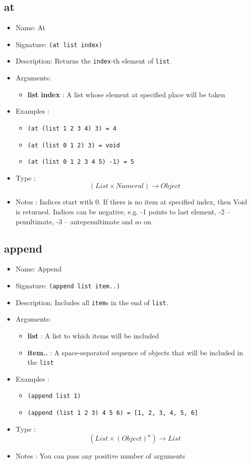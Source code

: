 \subsection{at}
\begin{itemize}
    \item Name: At
    \item Signature: \texttt{(at list index)}
    \item Description: Returns the \texttt{index}-th element of \texttt{list}.
    \item Arguments:
        \begin{itemize}
            \item \textbf{list index} : A list whose element at specified place will be taken
        \end{itemize}
    \item Examples :
        \begin{itemize}
            \item \texttt{(at (list 1 2 3 4) 3) = 4}
            \item \texttt{(at (list 0 1 2) 3) = void}
            \item \texttt{(at (list 0 1 2 3 4 5) -1) = 5}
        \end{itemize}
    \item Type : \[(List \times Numeral) \to Object\]
    \item Notes : Indices start with 0. If there is no item at specified index, then Void is returned. Indices can be negative, e.g. -1 points to last element, -2 -- penultimate, -3 -- antepenultimate and so on.
\end{itemize}

\subsection{append}
\begin{itemize}
    \item Name: Append
    \item Signature: \texttt{(append list item..)}
    \item Description: Includes all \texttt{item}s in the end of \texttt{list}.
    \item Arguments:
        \begin{itemize}
            \item \textbf{list} : A list to which items will be included
            \item \textbf{item..} : A space-separated sequence of objects that will be included in the \texttt{list}
        \end{itemize}
    \item Examples :
        \begin{itemize}
            \item \texttt{(append list 1)}
            \item \texttt{(append (list 1 2 3) 4 5 6) = [1, 2, 3, 4, 5, 6]}
        \end{itemize}
    \item Type : \[(List \times (Object)^n) \to List\]
    \item Notes : You can pass any positive number of arguments
\end{itemize}


